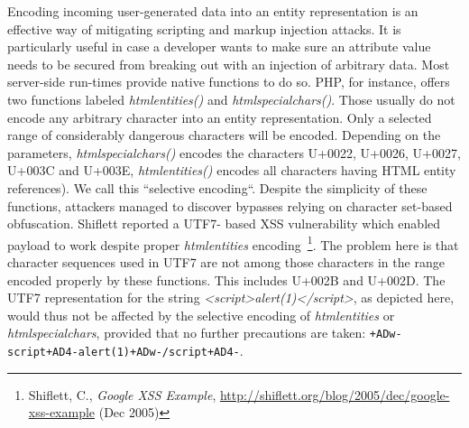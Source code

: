     Encoding incoming user-generated data into an entity representation is an effective way of mitigating scripting and markup injection attacks. It is particularly useful in case a developer wants to make sure an attribute value needs to be secured from breaking out with an injection of arbitrary data. Most server-side run-times provide native functions to do so. PHP, for instance, offers two functions labeled \textit{htmlentities()} and \textit{htmlspecialchars()}. Those usually do not encode any arbitrary character into an entity representation. Only a selected range of considerably dangerous characters will be encoded. Depending on the parameters, \textit{htmlspecialchars()} encodes the characters U+0022, U+0026, U+0027, U+003C and U+003E, \textit{htmlentities()} encodes all characters having HTML entity references). We call this ``selective encoding``. Despite the simplicity of these functions, attackers managed to discover bypasses relying on character set-based obfuscation. Shiflett reported a UTF7-
based XSS vulnerability which enabled payload to work despite proper \textit{htmlentities} encoding~\footnote{Shiflett, C., \textit{Google XSS Example}, \url{http://shiflett.org/blog/2005/dec/google-xss-example} (Dec 2005)}. The problem here is that character sequences used in UTF7 are not among those characters in the range encoded properly by these functions. This includes U+002B and U+002D. The UTF7 representation for the string \textit{<script>alert(1)</script>}, as depicted here, would thus not be affected by the selective encoding of \textit{htmlentities} or \textit{htmlspecialchars}, provided that no further precautions are taken: \texttt{+ADw-script+AD4-alert(1)+ADw-/script+AD4-}.\\


